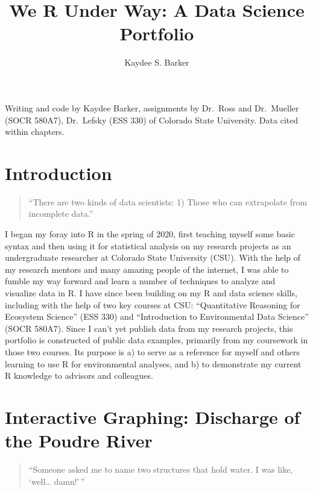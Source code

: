 \documentclass[
]{book}
\title{We R Under Way: A Data Science Portfolio}
\author{Kaydee S. Barker}
\date{}
\begin{document}
\maketitle

{
\setcounter{tocdepth}{1}
\tableofcontents
}
Writing and code by Kaydee Barker, assignments by Dr.~Ross and Dr.~Mueller (SOCR 580A7), Dr.~Lefsky (ESS 330) of Colorado State University. Data cited within chapters.

\hypertarget{introduction}{%
\chapter{Introduction}\label{introduction}}

\begin{quote}
``There are two kinds of data scientists: 1) Those who can extrapolate from incomplete data.''
\end{quote}

I began my foray into R in the spring of 2020, first teaching myself some basic syntax and then using it for statistical analysis on my research projects as an undergraduate researcher at Colorado State University (CSU). With the help of my research mentors and many amazing people of the internet, I was able to fumble my way forward and learn a number of techniques to analyze and visualize data in R. I have since been building on my R and data science skills, including with the help of two key courses at CSU: ``Quantitative Reasoning for Ecosystem Science'' (ESS 330) and ``Introduction to Environmental Data Science'' (SOCR 580A7). Since I can't yet publish data from my research projects, this portfolio is constructed of public data examples, primarily from my coursework in those two courses. Its purpose is a) to serve as a reference for myself and others learning to use R for environmental analyses, and b) to demonstrate my current R knowledge to advisors and colleagues.

\hypertarget{interactive-graphing-discharge-of-the-poudre-river}{%
\chapter{Interactive Graphing: Discharge of the Poudre River}\label{interactive-graphing-discharge-of-the-poudre-river}}

\begin{quote}
``Someone asked me to name two structures that hold water. I was like, `well\ldots{} damn!'\,''
\end{quote}
\end{document}
